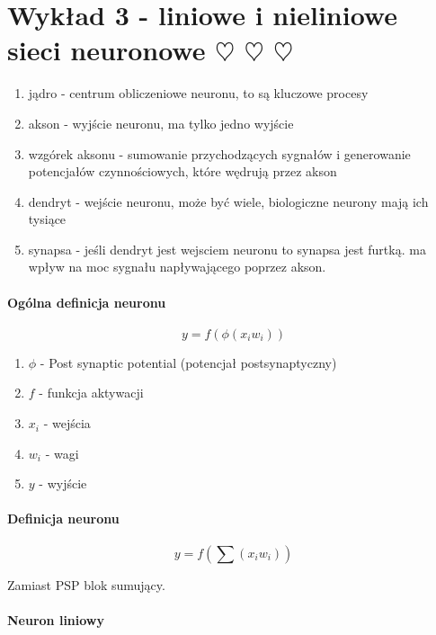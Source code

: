\section{Wykład 3 - liniowe i nieliniowe sieci neuronowe $\heartsuit$ $\heartsuit$ $\heartsuit$  }

\begin{enumerate}
 \item jądro - centrum obliczeniowe neuronu, to są kluczowe procesy
 \item akson - wyjście neuronu, ma tylko jedno wyjście
 \item wzgórek aksonu - sumowanie przychodzących sygnałów i generowanie potencjałów czynnościowych, które
 wędrują przez akson
 \item dendryt - wejście neuronu, może być wiele, biologiczne neurony mają ich tysiące
 \item synapsa - jeśli dendryt jest wejsciem neuronu to synapsa jest furtką. ma wpływ na moc sygnału napływającego poprzez akson.
\end{enumerate}

\paragraph{Ogólna definicja neuronu}

\begin{equation}
 y = f(\phi(x_i w_i))
\end{equation}

\begin{enumerate}
 \item $\phi$ - Post synaptic potential (potencjał postsynaptyczny)
 \item $f$ - funkcja aktywacji
 \item $x_i$ - wejścia
 \item $w_i$ - wagi
 \item $y$ - wyjście
\end{enumerate}

\paragraph{Definicja neuronu}

\begin{equation}
 y = f(\sum(x_i w_i))
\end{equation}

Zamiast PSP blok sumujący.

\paragraph{Neuron liniowy}

